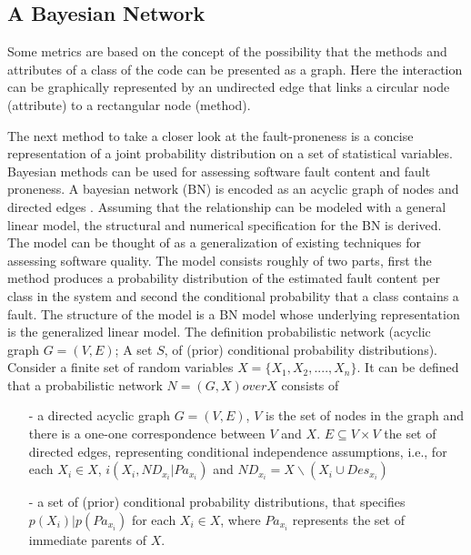 \subsection{A Bayesian Network}

Some metrics are based on the concept of the possibility that the methods and attributes of a class of the code can be presented as a graph. Here the interaction can be graphically represented by an undirected edge that links a circular node (attribute) to a rectangular node (method).

The next method to take a closer look at the fault-proneness is a concise representation of a joint probability distribution on a set of statistical variables. Bayesian methods can be used for assessing software fault content and fault proneness. A bayesian network (BN) is encoded as an acyclic graph of nodes and directed edges \cite{b9pai2007empirical}. Assuming that the relationship can be modeled with a general linear model, the structural and numerical specification for the BN is derived. The model can be thought of as a generalization of existing techniques for assessing software quality. The model consists roughly of two parts, first the method produces a probability distribution of the estimated fault content per class in the system and second the conditional probability that a class contains a fault. 
The structure of the model is a BN model whose underlying representation is the generalized linear model. The definition probabilistic network (acyclic graph $G=(V,E)$; A set $S$, of (prior) conditional probability distributions).
Consider a finite set of random variables $X=\{X_1,X_2,....,X_n\}$. It can be defined that a probabilistic network $N=(G,X) over X$ consists of
 \begin{enumerate}
 	\item[-] a directed acyclic graph $G=(V,E)$, $V$ is the set of nodes in the graph and there is a one-one correspondence between $V$ and $X$. $E \subseteq V \times V$ the set of directed edges, representing conditional independence assumptions, i.e., for each $X_i \in X$, $i(X_i,N D_{x_i}| Pa_{x_i})$ and $N D_{x_i} = X \backslash ({X_i} \cup Des_{x_i})$ 
 	\item[-] a set of (prior) conditional probability distributions, that specifies $p(X_i)| p(Pa_{x_i})$ for each $X_i \in X$, where $Pa_{x_i}$ represents the set of immediate parents of $X$.
 \end{enumerate} 

